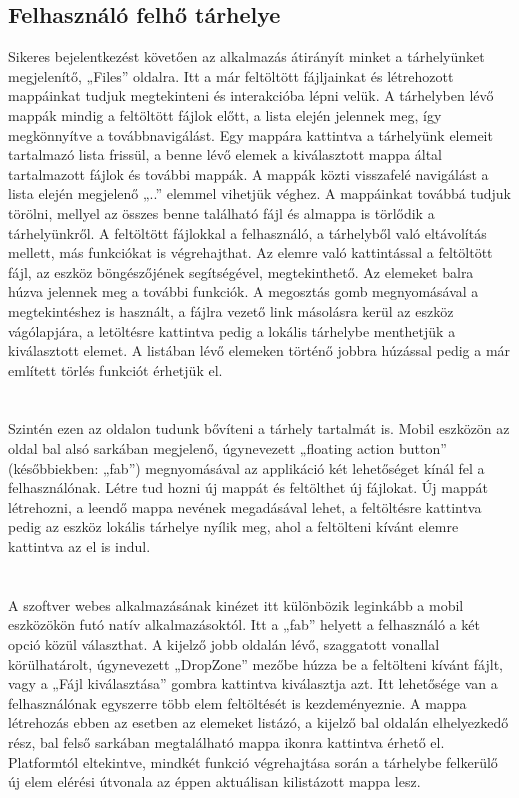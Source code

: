 \documentclass[12pt, twoside]{report}
\begin{document}
\subsection{Felhasználó felhő tárhelye}
Sikeres bejelentkezést követően az alkalmazás átirányít minket a tárhelyünket megjelenítő, „Files” oldalra. Itt a már feltöltött fájljainkat és létrehozott mappáinkat tudjuk megtekinteni és interakcióba lépni velük. A tárhelyben lévő mappák mindig a feltöltött fájlok előtt, a lista elején jelennek meg, így megkönnyítve a továbbnavigálást. Egy mappára kattintva a tárhelyünk elemeit tartalmazó lista frissül, a benne lévő elemek a kiválasztott mappa által tartalmazott fájlok és további mappák. A mappák közti visszafelé navigálást a lista elején megjelenő „..” elemmel vihetjük véghez. A mappáinkat továbbá tudjuk törölni, mellyel az összes benne található fájl és almappa is törlődik a tárhelyünkről. A feltöltött fájlokkal a felhasználó, a tárhelyből való eltávolítás mellett, más funkciókat is végrehajthat. Az elemre való kattintással a feltöltött fájl, az eszköz böngészőjének segítségével, megtekinthető. Az elemeket balra húzva jelennek meg a további funkciók. A megosztás gomb megnyomásával a megtekintéshez is használt, a fájlra vezető link másolásra kerül az eszköz vágólapjára, a letöltésre kattintva pedig a lokális tárhelybe menthetjük a kiválasztott elemet. A listában lévő elemeken történő jobbra húzással pedig a már említett törlés funkciót érhetjük el.
\\
\\
\\
Szintén ezen az oldalon tudunk bővíteni a tárhely tartalmát is. Mobil eszközön az oldal bal alsó sarkában megjelenő, úgynevezett „floating action button” (későbbiekben: „fab”) megnyomásával az applikáció két lehetőséget kínál fel a felhasználónak. Létre tud hozni új mappát és feltölthet új fájlokat. Új mappát létrehozni, a leendő mappa nevének megadásával lehet, a feltöltésre kattintva pedig az eszköz lokális tárhelye nyílik meg, ahol a feltölteni kívánt elemre kattintva az el is indul.
\\
\\
\\
A szoftver webes alkalmazásának kinézet itt különbözik leginkább a mobil eszközökön futó natív alkalmazásoktól. Itt a „fab” helyett a felhasználó a két opció közül választhat. A kijelző jobb oldalán lévő, szaggatott vonallal körülhatárolt, úgynevezett „DropZone” mezőbe húzza be a feltölteni kívánt fájlt, vagy a „Fájl kiválasztása” gombra kattintva kiválasztja azt. Itt lehetősége van a felhasználónak egyszerre több elem feltöltését is kezdeményeznie. A mappa létrehozás ebben az esetben az elemeket listázó, a kijelző bal oldalán elhelyezkedő rész, bal felső sarkában megtalálható mappa ikonra kattintva érhető el. Platformtól eltekintve, mindkét funkció végrehajtása során a tárhelybe felkerülő új elem elérési útvonala az éppen aktuálisan kilistázott mappa lesz.
\end{document}
